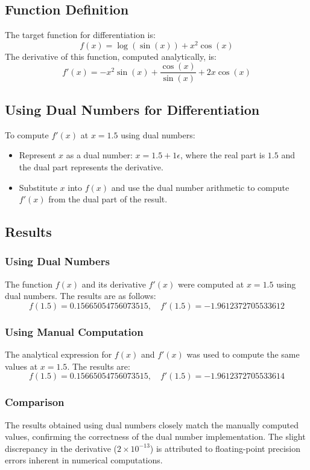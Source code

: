 \documentclass[a4paper,12pt]{article}
\begin{document}
\subsection{Function Definition}
The target function for differentiation is:
\[
f(x) = \log(\sin(x)) + x^2 \cos(x)
\]
The derivative of this function, computed analytically, is:
\[
f'(x) = -x^2 \sin(x) + \frac{\cos(x)}{\sin(x)} + 2x \cos(x)
\]

\subsection{Using Dual Numbers for Differentiation}
To compute \(f'(x)\) at \(x = 1.5\) using dual numbers:
\begin{itemize}
    \item Represent \(x\) as a dual number: \(x = 1.5 + 1\epsilon\), where the real part is \(1.5\) and the dual part represents the derivative.
    \item Substitute \(x\) into \(f(x)\) and use the dual number arithmetic to compute \(f'(x)\) from the dual part of the result.
\end{itemize}

\subsection{Results}

\subsubsection{Using Dual Numbers}
The function \(f(x)\) and its derivative \(f'(x)\) were computed at \(x = 1.5\) using dual numbers. The results are as follows:
\[
f(1.5) = 0.15665054756073515, \quad f'(1.5) = -1.9612372705533612
\]

\subsubsection{Using Manual Computation}
The analytical expression for \(f(x)\) and \(f'(x)\) was used to compute the same values at \(x = 1.5\). The results are:
\[
f(1.5) = 0.15665054756073515, \quad f'(1.5) = -1.9612372705533614
\]

\subsubsection{Comparison}
The results obtained using dual numbers closely match the manually computed values, confirming the correctness of the dual number implementation. The slight discrepancy in the derivative (\(2 \times 10^{-13}\)) is attributed to floating-point precision errors inherent in numerical computations.
\end{document}
